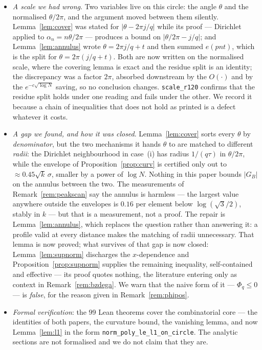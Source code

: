 \documentclass[11pt,a4paper]{article}
\theoremstyle{plain}
\theoremstyle{definition}
\theoremstyle{remark}
\begin{document}
\begin{itemize}
      heading, because the reader of an earlier version deserves to know what
      changed.
\item \emph{A scale we had wrong}. Two variables live on this circle: the angle
      $\theta$ and the normalised $\theta/2\pi$, and the argument moved between
      them silently. Lemma~\ref{lem:cover} was stated for
      $|\theta-2\pi j/q|$ while its proof --- Dirichlet applied to
      $\alpha_n=n\theta/2\pi$ --- produces a bound on $|\theta/2\pi-j/q|$; and
      Lemma~\ref{lem:annulus} wrote $\theta=2\pi j/q+t$ and then summed
      $e(pnt)$, which is the split for $\theta=2\pi(j/q+t)$. Both are now
      written on the normalised scale, where the covering lemma is exact and the
      residue split is an identity; the discrepancy was a factor $2\pi$, absorbed
      downstream by the $O(\cdot)$ and by the $e^{-c\sqrt{\log N}}$ saving, so no
      conclusion changes. \texttt{scale\_r120} confirms that the residue split
      holds under one reading and fails under the other. We record it because a
      chain of inequalities that does not hold as printed is a defect whatever
      it costs.
\item \emph{A gap we found, and how it was closed}. Lemma~\ref{lem:cover} sorts
      every $\theta$ by \emph{denominator}, but the two mechanisms it hands
      $\theta$ to are matched to different \emph{radii}: the Dirichlet
      neighbourhood in case~(i) has radius $1/(q\tau)$ in $\theta/2\pi$, while the envelope of
      Proposition~\ref{prop:curv} is certified only out to
      $\approx0.45\sqrt k\,\sigma$, smaller by a power of $\log N$. Nothing in
      this paper bounds $|G_B|$ on the annulus between the two. The measurements
      of Remark~\ref{rem:peakscan} say the annulus is harmless --- the largest
      value anywhere outside the envelopes is $0.16$ per element below
      $\log(\sqrt3/2)$, stably in $k$ --- but that is a measurement, not a
      proof. The repair is Lemma~\ref{lem:annulus}, which replaces the question
      rather than answering it: a profile valid at every distance makes the
      matching of radii unnecessary. That lemma is now proved; what survives of
      that gap is now closed: Lemma~\ref{lem:supnorm} discharges the
      $x$-dependence and Proposition~\ref{prop:supnorm} supplies the remaining
      inequality, self-contained and effective --- its proof quotes nothing, the
      literature entering only as context in Remark~\ref{rem:bzdega}. We warn that
      the naive form of it --- $\Phi_q\le0$ --- is \emph{false}, for the reason
      given in Remark~\ref{rem:phipos}.
\item \emph{Formal verification}: the $99$ Lean theorems cover the
      combinatorial core --- the identities of both papers, the curvature bound,
      the vanishing lemma, and now Lemma~\ref{lem:l1} in the form
      \texttt{norm\_poly\_le\_l1\_on\_circle}. The analytic sections are not
      formalised and we do not claim that they are.
\end{itemize}
\end{document}
